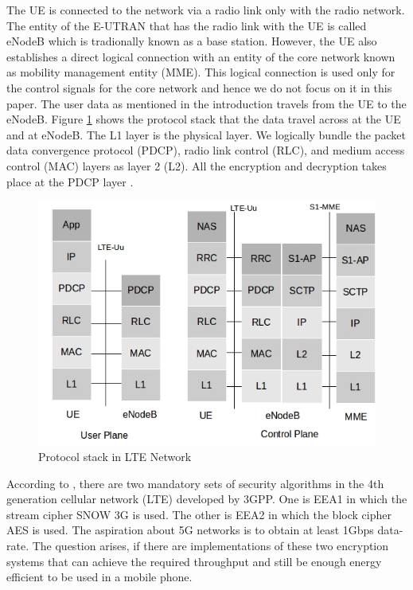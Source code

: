 \documentclass[lnicst,sechang,a4paper]{svmultln}
\begin{document}
The UE is connected to the network via a radio link only with the radio network. The entity of the E-UTRAN that has the radio link with the UE is called eNodeB which is tradionally known as a base station. However, the UE also establishes a direct logical connection with an entity of the core network known as mobility management entity (MME). This logical connection is used only for the control signals for the core network and hence we do not focus on it in this paper. The user data as mentioned in the introduction travels from the UE to the eNodeB. Figure \ref{fig:protocl_stack} shows the protocol stack that the data travel across at the UE and at eNodeB. The L1 layer is the physical layer. We logically bundle the packet data convergence protocol (PDCP), radio link control (RLC), and medium access control (MAC) layers as layer 2 (L2). All the encryption and decryption takes place at the PDCP layer \cite{3GPP_TS_36_323}.

\begin{figure}
  \includegraphics[width=.85\textwidth]{protocol_stack.jpg}
\caption{Protocol stack in LTE Network}
\label{fig:protocl_stack}       %
\end{figure}

According to \cite{3GPP_TS_33_401}, there are two mandatory sets of security algorithms in the 4th generation cellular network (LTE) developed by 3GPP. One is EEA1 in which the stream cipher SNOW 3G is used. The other is EEA2 in which the block cipher AES is used. The aspiration about 5G networks is to obtain at least 1Gbps data-rate. The question arises, if there are implementations of these two encryption systems that can achieve the required throughput and still be enough energy efficient to be used in a mobile phone.
\end{document}
